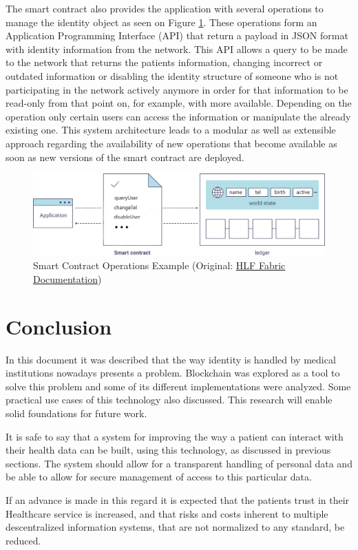\documentclass[]{llncs}
\begin{document}
The smart contract also provides the application with several operations to manage the identity object as seen 
on Figure \ref{fig:smartContractOverview}.
These operations form an Application Programming Interface (API) that return a payload in JSON format with 
identity information from the network. 
This API allows a query to be made to the network that returns the patients information, changing incorrect 
or outdated information or disabling the identity structure of someone who is not participating in the network 
actively anymore in order for that information to be read-only from that point on, for example, with more available. 
Depending on the operation only certain users can access the information or manipulate the already existing one.
This system architecture leads to a modular as well as extensible approach regarding the availability of new 
operations that become available as soon as new versions of the smart contract are deployed. 
\begin{figure}[ht]
\centering
\includegraphics[width=1\linewidth]{images/smartContractOverview.png}
\caption{\label{fig:smartContractOverview}Smart Contract Operations Example (Original: \href{http://hyperledger-fabric.readthedocs.io/en/latest/write_first_app.html}{HLF Fabric Documentation})}
\end{figure}
\newpage

\section{Conclusion} \label{conclusion}
In this document it was described that the way identity is handled by medical institutions nowadays 
presents a problem. Blockchain was explored as a tool to solve this problem and some of its different 
implementations were analyzed. Some practical use cases of this technology also discussed. 
This research will enable solid foundations for future work.

It is safe to say that a system for improving the way a patient can interact with their health data 
can be built, using this technology, as discussed in previous sections. 
The system should allow for a transparent handling of personal data and be able to allow for secure 
management of access to this particular data.

If an advance is made in this regard it is expected that the patients trust in their Healthcare service 
is increased, and that risks and costs inherent to multiple descentralized information systems, that are 
not normalized to any standard, be reduced. 
\newpage


\begingroup
\nocite{*}
\raggedright


\endgroup
\end{document}
